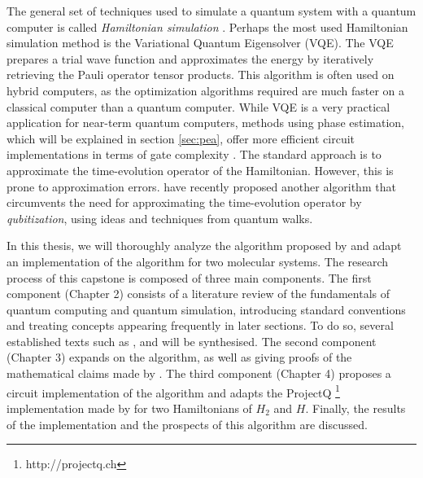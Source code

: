 The general set of techniques used to simulate a quantum system with a quantum computer is called \textit{Hamiltonian simulation} \cite{cao}. Perhaps the most used Hamiltonian simulation method is the Variational Quantum Eigensolver (VQE). The VQE prepares a trial wave function and approximates the energy by iteratively retrieving the Pauli operator tensor products. This algorithm is often used on hybrid computers, as the optimization algorithms required are much faster on a classical computer than a quantum computer. While VQE is a very practical application for near-term quantum computers, methods using phase estimation, which will be explained in section \ref{sec:pea}, offer more efficient circuit implementations in terms of gate complexity \cite{bian}. The standard approach is to approximate the time-evolution operator of the Hamiltonian. However, this is prone to approximation errors. \textcite{poulin} have recently proposed another algorithm that circumvents the need for approximating the time-evolution operator by \textit{qubitization}, using ideas and techniques from quantum walks.

\vspace{5mm}

In this thesis, we will thoroughly analyze the algorithm proposed by \textcite{poulin} and adapt an implementation of the algorithm for two molecular systems. The research process of this capstone is composed of three main components. The first component (Chapter 2) consists of a literature review of the fundamentals of quantum computing and quantum simulation, introducing standard conventions and treating concepts appearing frequently in later sections. To do so, several established texts such as \textcite{nielsen}, \textcite{McArdle} and \textcite{cao} will be synthesised. The second component (Chapter 3)  expands on the algorithm, as well as giving proofs of the mathematical claims made by \textcite{poulin}. The third component (Chapter 4) proposes a circuit implementation of the algorithm and adapts the ProjectQ \footnote{http://projectq.ch} implementation made by \textcite{steiger} for two Hamiltonians of $H_2$ and $H$. Finally, the results of the implementation and the prospects of this algorithm are discussed.

